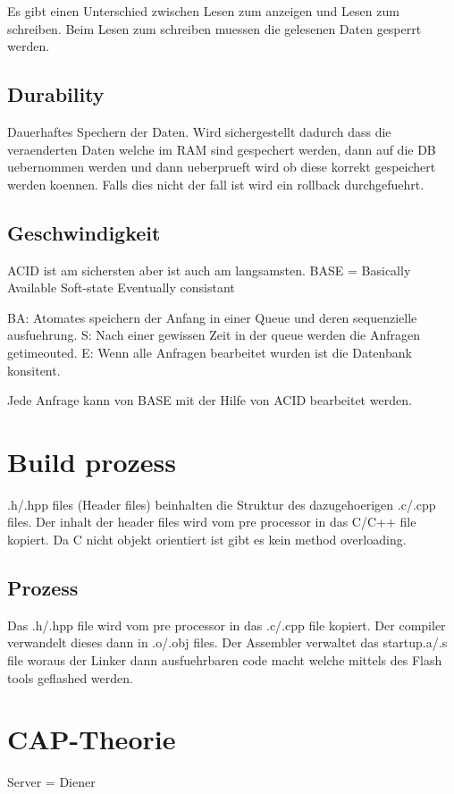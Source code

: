 Es gibt einen Unterschied zwischen Lesen zum anzeigen und Lesen zum schreiben. Beim Lesen zum schreiben muessen die gelesenen Daten gesperrt werden.

\subsection{Durability}
Dauerhaftes Spechern der Daten.
Wird sichergestellt dadurch dass die veraenderten Daten welche im RAM sind gespechert werden, dann auf die DB uebernommen werden und dann ueberprueft wird ob diese korrekt gespeichert werden koennen.
Falls dies nicht der fall ist wird ein rollback durchgefuehrt.

\subsection{Geschwindigkeit}
ACID ist am sichersten aber ist auch am langsamsten.
BASE = Basically Available Soft-state Eventually consistant

BA: Atomates speichern der Anfang in einer Queue und deren sequenzielle ausfuehrung.
S: Nach einer gewissen Zeit in der queue werden die Anfragen getimeouted.
E: Wenn alle Anfragen bearbeitet wurden ist die Datenbank konsitent.

Jede Anfrage kann von BASE mit der Hilfe von ACID bearbeitet werden.

\section{Build prozess}

.h/.hpp files (Header files) beinhalten die Struktur des dazugehoerigen .c/.cpp files.
Der inhalt der header files wird vom pre processor in das C/C++ file kopiert.
Da C nicht objekt orientiert ist gibt es kein method overloading.

\subsection{Prozess}
Das .h/.hpp file wird vom pre processor in das .c/.cpp file kopiert. Der compiler verwandelt dieses dann in .o/.obj files.
Der Assembler verwaltet das startup.a/.s file woraus der Linker dann ausfuehrbaren code macht welche mittels des Flash tools geflashed werden.

\section{CAP-Theorie}
Server = Diener

